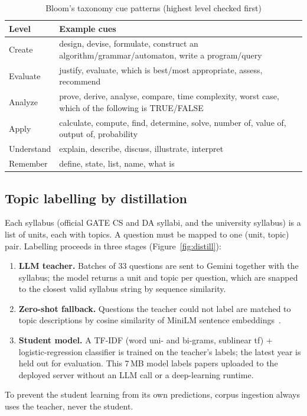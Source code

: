 \begin{table}[h]
\centering
\caption{Bloom's taxonomy cue patterns (highest level checked first)}
\label{tab:bloom}
\small
\begin{tabularx}{\textwidth}{@{}lX@{}}
\toprule
\textbf{Level} & \textbf{Example cues}\\
\midrule
Create & design, devise, formulate, construct an algorithm/grammar/automaton, write a program/query\\
Evaluate & justify, evaluate, which is best/most appropriate, assess, recommend\\
Analyze & prove, derive, analyse, compare, time complexity, worst case, which of the following is TRUE/FALSE\\
Apply & calculate, compute, find, determine, solve, number of, value of, output of, probability\\
Understand & explain, describe, discuss, illustrate, interpret\\
Remember & define, state, list, name, what is\\
\bottomrule
\end{tabularx}
\end{table}

\subsection{Topic labelling by distillation}
Each syllabus (official GATE CS and DA syllabi, and the university syllabus) is a list of units, each with topics. A
question must be mapped to one (unit, topic) pair. Labelling proceeds in three stages (Figure~\ref{fig:distill}):
\begin{enumerate}
  \item \textbf{LLM teacher.} Batches of 33 questions are sent to Gemini together with the syllabus; the model returns a
        unit and topic per question, which are snapped to the closest valid syllabus string by sequence similarity.
  \item \textbf{Zero-shot fallback.} Questions the teacher could not label are matched to topic descriptions by cosine
        similarity of MiniLM sentence embeddings~\cite{reimers2019,wang2020minilm}.
  \item \textbf{Student model.} A TF-IDF (word uni- and bi-grams, sublinear tf) + logistic-regression classifier is
        trained on the teacher's labels; the latest year is held out for evaluation. This 7\,MB model labels papers
        uploaded to the deployed server without an LLM call or a deep-learning runtime.
\end{enumerate}
To prevent the student learning from its own predictions, corpus ingestion always uses the teacher, never the student.

